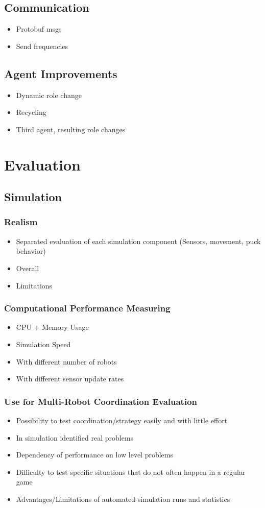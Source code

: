 \documentclass[a4paper,11pt]{article}
\begin{document}
\subsection{Communication}
\begin{itemize}
\item Protobuf msgs
\item Send frequencies
\end{itemize}
\subsection{Agent Improvements}
\begin{itemize}
\item Dynamic role change
\item Recycling
\item Third agent, resulting role changes
\end{itemize}


\section{Evaluation}
\subsection{Simulation}
\subsubsection{Realism}
\begin{itemize}
\item Separated evaluation of each simulation component (Sensors, movement, puck behavior)
\item Overall
\item Limitations
\end{itemize}
\subsubsection{Computational Performance Measuring}
\begin{itemize}
\item CPU + Memory Usage
\item Simulation Speed
\item With different number of robots
\item With different sensor update rates
\end{itemize}
\subsubsection{Use for Multi-Robot Coordination Evaluation}
\begin{itemize}
\item Possibility to test coordination/strategy easily and with little effort
\item In simulation identified real problems
\item Dependency of performance on low level problems
\item Difficulty to test specific situations that do not often happen in a regular game
\item Advantages/Limitations of automated simulation runs and statistics
\end{itemize}
\end{document}
